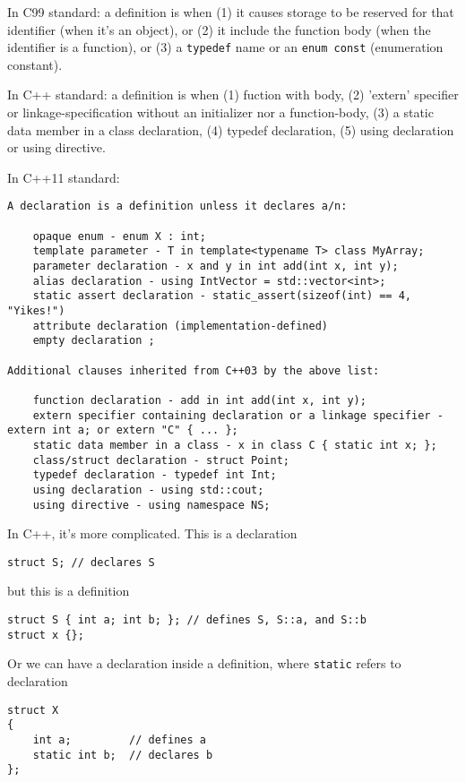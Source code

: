 \begin{mdframed}

In C99 standard: a definition is when (1) it causes storage to be reserved for
that identifier (when it's an object), or (2) it include the function body
(when the identifier is a function), or (3) a \verb!typedef! name or an
\verb!enum const! (enumeration constant). 

In C++ standard: a definition is when (1) fuction with body, (2) 'extern'
specifier or linkage-specification without an initializer nor a function-body,
(3) a static data member in a class declaration, (4) typedef declaration, (5)
using declaration or using directive.

In C++11 standard:
\begin{verbatim}
A declaration is a definition unless it declares a/n:

    opaque enum - enum X : int;
    template parameter - T in template<typename T> class MyArray;
    parameter declaration - x and y in int add(int x, int y);
    alias declaration - using IntVector = std::vector<int>;
    static assert declaration - static_assert(sizeof(int) == 4, "Yikes!")
    attribute declaration (implementation-defined)
    empty declaration ;

Additional clauses inherited from C++03 by the above list:

    function declaration - add in int add(int x, int y);
    extern specifier containing declaration or a linkage specifier - extern int a; or extern "C" { ... };
    static data member in a class - x in class C { static int x; };
    class/struct declaration - struct Point;
    typedef declaration - typedef int Int;
    using declaration - using std::cout;
    using directive - using namespace NS;

\end{verbatim}

\end{mdframed}

In C++, it's more complicated. This is a declaration
\begin{verbatim}
struct S; // declares S
\end{verbatim}

but this is a definition
\begin{verbatim}
struct S { int a; int b; }; // defines S, S::a, and S::b
struct x {};
\end{verbatim}

Or we can have a declaration inside a definition, where \verb!static! refers to
declaration
\begin{verbatim}
struct X
{
    int a;         // defines a
    static int b;  // declares b
};
\end{verbatim}

